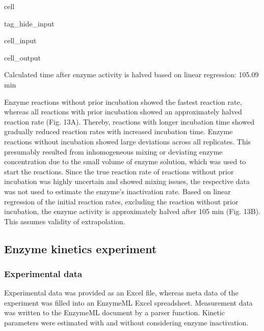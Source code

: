 \documentclass[letterpaper,12pt,english]{jupyterBook}
\begin{document}
\begin{sphinxuseclass}{cell}
\begin{sphinxuseclass}{tag_hide_input}
\begin{sphinxVerbatimInput}
\begin{sphinxuseclass}{cell_input}
\end{sphinxuseclass}\end{sphinxVerbatimInput}
\begin{sphinxVerbatimOutput}

\begin{sphinxuseclass}{cell_output}
\begin{sphinxVerbatim}[commandchars=\\\{\}]
Calculated time after enzyme activity is halved based on linear regression: 105.09 min
\end{sphinxVerbatim}

\noindent{}

\end{sphinxuseclass}\end{sphinxVerbatimOutput}

\end{sphinxuseclass}
\end{sphinxuseclass}
\sphinxAtStartPar
{}

\sphinxAtStartPar
Enzyme reactions without prior incubation showed the fastest reaction rate, whereas all reactions with prior incubation showed an approximately halved reaction rate (Fig. 13A). Thereby, reactions with longer incubation time showed gradually reduced reaction rates with increased incubation time. Enzyme reactions without incubation showed large deviations across all replicates. This presumably resulted from inhomogeneous mixing or deviating enzyme concentration due to the small volume of enzyme solution, which was used to start the reactions. Since the true reaction rate of reactions without prior incubation was highly uncertain and showed mixing issues, the respective data was not used to estimate the enzyme’s inactivation rate.
Based on linear regression of the initial reaction rates, excluding the reaction without prior incubation, the enzyme activity is approximately halved after 105 min (Fig. 13B). This assumes validity of extrapolation.


\subsection{Enzyme kinetics experiment}
\label{\detokenize{scenarios/enzyme_inactivation:enzyme-kinetics-experiment}}

\subsubsection{Experimental data}
\label{\detokenize{scenarios/enzyme_inactivation:id1}}
\sphinxAtStartPar
Experimental data was provided as an Excel file, whereas meta data of the experiment was filled into an EnzymeML Excel spreadsheet. Measurement data was written to the EnzymeML document by a parser function.
Kinetic parameters were estimated with and without considering enzyme inactivation.
\end{document}
